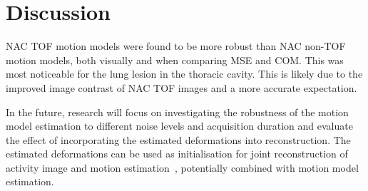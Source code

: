 \documentclass[journal]{IEEEtran}
\begin{document}
\section{Discussion}
NAC TOF motion models were found to be more robust than NAC non-TOF motion models, both visually and when comparing MSE and COM. This was most noticeable for the lung lesion in the thoracic cavity. This is likely due to the improved image contrast of NAC TOF images and a more accurate expectation.

In the future, research will focus on investigating the robustness of the motion model estimation to different noise levels and acquisition duration and evaluate the effect of incorporating the estimated deformations into reconstruction. The estimated deformations can be used as initialisation for joint reconstruction of activity image and motion estimation~\cite{Bousse2016a}, potentially combined with motion model estimation.





%
%
%



% 
% 

\AtNextBibliography{\small}
\printbibliography


\end{document}

